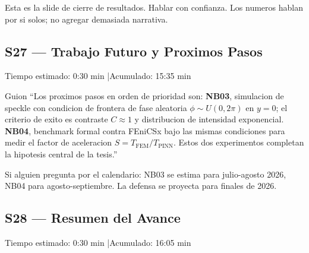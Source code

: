 \begin{tipbox}
Esta es la slide de cierre de resultados. Hablar con confianza. Los numeros
hablan por si solos; no agregar demasiada narrativa.
\end{tipbox}

\vspace{8pt}

\subsection{S27 --- Trabajo Futuro y Proximos Pasos}

\begin{timebox}
Tiempo estimado: 0:30 min \quad|\quad Acumulado: 15:35 min
\end{timebox}
\vspace{4pt}

\begin{slidebox}{Guion}
``Los proximos pasos en orden de prioridad son: \textbf{NB03}, simulacion de
speckle con condicion de frontera de fase aleatoria $\phi \sim U(0, 2\pi)$ en
$y=0$; el criterio de exito es contraste $C \approx 1$ y distribucion de intensidad
exponencial. \textbf{NB04}, benchmark formal contra FEniCSx bajo las mismas
condiciones para medir el factor de aceleracion $S = T_\text{FEM}/T_\text{PINN}$.
Estos dos experimentos completan la hipotesis central de la tesis.''
\end{slidebox}
\vspace{4pt}

\begin{tipbox}
Si alguien pregunta por el calendario: NB03 se estima para julio-agosto 2026,
NB04 para agosto-septiembre. La defensa se proyecta para finales de 2026.
\end{tipbox}

\vspace{8pt}

\subsection{S28 --- Resumen del Avance}

\begin{timebox}
Tiempo estimado: 0:30 min \quad|\quad Acumulado: 16:05 min
\end{timebox}
\vspace{4pt}

